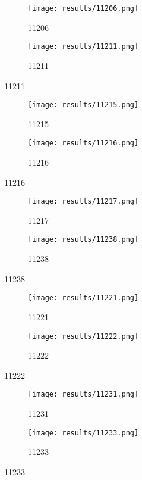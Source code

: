 \documentclass{article}
\begin{document}
\begin{figure}[!hbt]
\begin{subfigure}[!hbt]{0.5\linewidth}\texttt{[image: results/11206.png]}\caption{11206}\end{subfigure}
\begin{subfigure}[!hbt]{0.5\linewidth}\texttt{[image: results/11211.png]}\caption{11211}\end{subfigure}
\end{figure}
\begin{figure}[!hbt]
\begin{subfigure}[!hbt]{0.5\linewidth}\texttt{[image: results/11215.png]}\caption{11215}\end{subfigure}
\begin{subfigure}[!hbt]{0.5\linewidth}\texttt{[image: results/11216.png]}\caption{11216}\end{subfigure}
\end{figure}
\begin{figure}[!hbt]
\begin{subfigure}[!hbt]{0.5\linewidth}\texttt{[image: results/11217.png]}\caption{11217}\end{subfigure}
\begin{subfigure}[!hbt]{0.5\linewidth}\texttt{[image: results/11238.png]}\caption{11238}\end{subfigure}
\end{figure}
\begin{figure}[!hbt]
\begin{subfigure}[!hbt]{0.5\linewidth}\texttt{[image: results/11221.png]}\caption{11221}\end{subfigure}
\begin{subfigure}[!hbt]{0.5\linewidth}\texttt{[image: results/11222.png]}\caption{11222}\end{subfigure}
\end{figure}
\begin{figure}[!hbt]
\begin{subfigure}[!hbt]{0.5\linewidth}\texttt{[image: results/11231.png]}\caption{11231}\end{subfigure}
\begin{subfigure}[!hbt]{0.5\linewidth}\texttt{[image: results/11233.png]}\caption{11233}\end{subfigure}
\end{figure}
\end{document}
